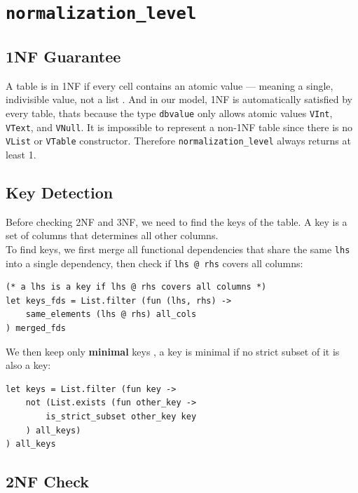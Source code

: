 \documentclass[11pt]{article}
\begin{document}
\section{\texttt{normalization\_level}}

\subsection{1NF Guarantee}

A table is in 1NF if every cell contains an atomic value — meaning a single, indivisible value, not a list . And in our model, 1NF is automatically satisfied by every table, thats because the type \texttt{dbvalue} only allows atomic values \texttt{VInt}, \texttt{VText}, and \texttt{VNull}. It is impossible to represent a non-1NF table since there is no \texttt{VList} or \texttt{VTable} constructor. Therefore \texttt{normalization\_level} always returns at least 1.

\subsection{Key Detection}

Before checking 2NF and 3NF, we need to find the keys of the table. A key is a set of columns that determines all other columns. \\

To find keys, we first merge all functional dependencies that share the same \texttt{lhs} into a single dependency, then check if \texttt{lhs @ rhs} covers all columns:

\begin{lstlisting}
(* a lhs is a key if lhs @ rhs covers all columns *)
let keys_fds = List.filter (fun (lhs, rhs) -> 
    same_elements (lhs @ rhs) all_cols
) merged_fds
\end{lstlisting}

We then keep only \textbf{minimal} keys , a key is minimal if no strict subset of it is also a key:

\begin{lstlisting}
let keys = List.filter (fun key ->
    not (List.exists (fun other_key ->
        is_strict_subset other_key key
    ) all_keys)
) all_keys
\end{lstlisting}

\subsection{2NF Check}
\end{document}
